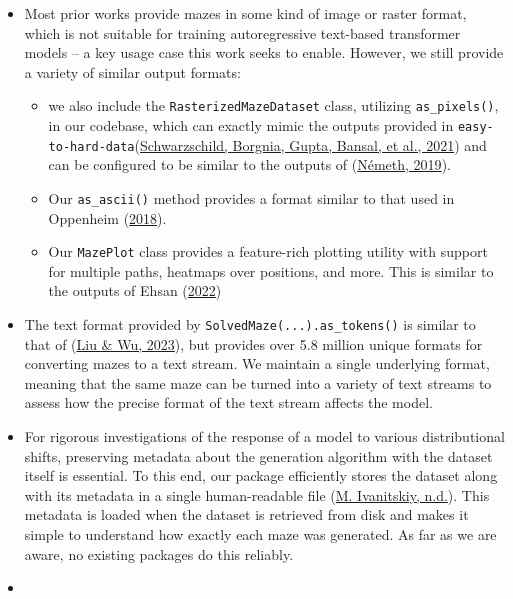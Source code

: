\documentclass[10pt,a4paper,onecolumn]{article}
\providecommand{\tightlist}{%
  \setlength{\itemsep}{0pt}\setlength{\parskip}{0pt}}
\begin{document}
\begin{itemize}
\item
  Most prior works provide mazes in some kind of image or raster format,
  which is not suitable for training autoregressive text-based
  transformer models -- a key usage case this work seeks to enable.
  However, we still provide a variety of similar output formats:

  \begin{itemize}
  \tightlist
  \item
    we also include the \texttt{RasterizedMazeDataset} class, utilizing
    \texttt{as\_pixels()}, in our codebase, which can exactly mimic the
    outputs provided in
    \texttt{easy-to-hard-data}(\protect\hyperlink{ref-easy_to_hard}{Schwarzschild,
    Borgnia, Gupta, Bansal, et al., 2021}) and can be configured to be
    similar to the outputs of
    (\protect\hyperlink{ref-gh_Nemeth_2019}{Németh, 2019}).
  \item
    Our \texttt{as\_ascii()} method provides a format similar to that
    used in Oppenheim
    (\protect\hyperlink{ref-gh-oppenheimj2018maze}{2018}).
  \item
    Our \texttt{MazePlot} class provides a feature-rich plotting utility
    with support for multiple paths, heatmaps over positions, and more.
    This is similar to the outputs of Ehsan
    (\protect\hyperlink{ref-gh_Ehsan_2022}{2022})
  \end{itemize}
\item
  The text format provided by \texttt{SolvedMaze(...).as\_tokens()} is
  similar to that of (\protect\hyperlink{ref-eval-LLM-graphs}{Liu \& Wu,
  2023}), but provides over 5.8 million unique formats for converting
  mazes to a text stream. We maintain a single underlying format,
  meaning that the same maze can be turned into a variety of text
  streams to assess how the precise format of the text stream affects
  the model.
\item
  For rigorous investigations of the response of a model to various
  distributional shifts, preserving metadata about the generation
  algorithm with the dataset itself is essential. To this end, our
  package efficiently stores the dataset along with its metadata in a
  single human-readable file (\protect\hyperlink{ref-zanj}{M.
  Ivanitskiy, n.d.}). This metadata is loaded when the dataset is
  retrieved from disk and makes it simple to understand how exactly each
  maze was generated. As far as we are aware, no existing packages do
  this reliably.
\item

\end{itemize}
\end{document}
